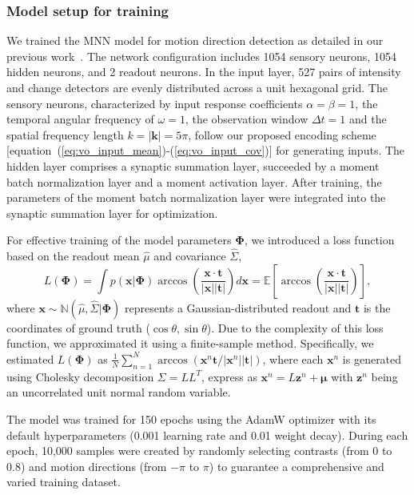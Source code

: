 \subsubsection{Model setup for training}
We trained the MNN model for motion direction detection as detailed in our previous work~\cite{Qi2023}.
The network configuration includes 1054 sensory neurons, 1054 hidden neurons, and 2 readout neurons. 
In the input layer, 527 pairs of intensity and change detectors are evenly distributed across a unit hexagonal grid. 
The sensory neurons, characterized by input response coefficients \(\alpha = \beta = 1\), the temporal angular frequency of \(\omega = 1\), the observation window  \(\Delta t = 1\) and the spatial frequency length \(k = |\mathbf{k}| = 5\pi\), follow our proposed encoding scheme  [equation~(\ref{eq:vo_input_mean})-(\ref{eq:vo_input_cov})] for generating inputs.
The hidden layer comprises a synaptic summation layer, succeeded by a moment batch normalization layer and a moment activation layer. 
After training, the parameters of the moment batch normalization layer were integrated into the synaptic summation layer for optimization.

For effective training of the model parameters \(\bm{\Phi}\), we introduced a loss function based on the readout mean \(\hat{\mu}\) and covariance \(\hat{\Sigma}\),
\begin{equation}
    L(\bm{\Phi}) = \int p(\mathbf{x|\bm{\Phi}}) \arccos\left( \frac{\mathbf{x} \cdot \mathbf{t}}{|\mathbf{x}||\mathbf{t}|}\right) d\mathbf{x} = \mathbb{E}\left[\arccos\left( \frac{\mathbf{x} \cdot \mathbf{t}}{|\mathbf{x}||\mathbf{t}|}\right) \right],
    \label{eq:loss_function}
\end{equation}
where \(\mathbf{x} \sim \mathbb{N}(\hat{\mu}, \hat{\Sigma}|\bm{\Phi})\) represents a Gaussian-distributed readout and \(\mathbf{t}\) is the coordinates of ground truth (\(\cos \theta, \sin \theta\)).
Due to the complexity of this loss function, we approximated it using a finite-sample method. 
Specifically, we estimated \(L(\bm{\Phi})\) as \(\frac{1}{N}\sum_{n=1}^N \arccos (\mathbf{x}^n\mathbf{t}/|\mathbf{x}^n||\mathbf{t}|)\), where each \(\mathbf{x}^n\) is generated using Cholesky decomposition \(\Sigma =  LL^T\), express as \(\mathbf{x}^n = L\mathbf{z}^n + \mathbf{\mu}\) with \(\mathbf{z}^n\) being an uncorrelated unit normal random variable.

The model was trained for 150 epochs using the AdamW optimizer with its default hyperparameters (0.001 learning rate and 0.01 weight decay). 
During each epoch, 10,000 samples were created by randomly selecting contrasts (from 0 to 0.8) and motion directions (from \(-\pi\) to \(\pi\)) to guarantee a comprehensive and varied training dataset.

